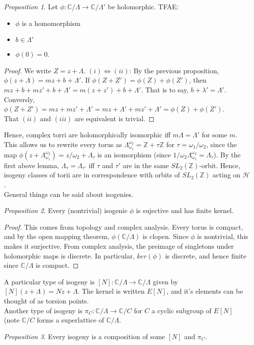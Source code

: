 \documentclass[11pt]{article}
\theoremstyle{definition}
\theoremstyle{example}
\theoremstyle{remark}
\theoremstyle{lemma}
\theoremstyle{proposition}
\newtheorem{proposition}{Proposition}[section]
\theoremstyle{Problem}
\theoremstyle{Solution}
\theoremstyle{theorem}
\theoremstyle{corollary}
\begin{document}
\begin{proposition}
Let $\phi : \mathbb{C}/\Lambda \to \mathbb{C}/\Lambda'$ be holomorphic. TFAE:
\begin{itemize}
\item $\phi$ is a homomorphism
\item $b\in\Lambda'$
\item $\phi(0) = 0$.
\end{itemize}
\end{proposition}
\begin{proof}
We write $Z = z+\Lambda$.
$(i)\iff (ii)$: By the previous proposition, $\phi(z+\Lambda) = mz+b+\Lambda'$. If $\phi(Z+Z') = \phi(Z)+\phi(Z')$, then $mz+b + mz'+b + \Lambda' = m(z+z') + b + \Lambda'$. That is to say, $b+\lambda' = \Lambda'$. Conversly, $\phi(Z+Z') = mz+mz'+\Lambda' = mz+\Lambda' + mz' +\Lambda' = \phi(Z) + \phi(Z')$.\\
That $(ii)$ and $(iii)$ are equivalent is trivial.
\end{proof}
Hence, complex torri are holomorphically isomorphic iff $m\Lambda = \Lambda'$ for some $m$. This allows us to rewrite every torus as $\Lambda_{\omega_1}^{\omega_2} = \mathbb{Z}+\tau\mathbb{Z}$ for $\tau = \omega_1/\omega_2$, since the map $\phi(z+\Lambda_{\omega_1}^{\omega_2}) = z/\omega_2 + \Lambda_\tau$ is an isomorphism (since $1/\omega_2\Lambda_{\omega_1}^{\omega_2} = \Lambda_\tau$). By the first above lemma, $\Lambda_\tau = \Lambda_{\tau'}$ iff $\tau$ and $\tau'$ are in the same $SL_2(\mathbb{Z})$-orbit. Hence, isogeny classes of torii are in correspondence with orbits of $SL_2(\mathbb{Z})$ acting on $\mathcal{H}$.\\
General things can be said about isogenies.
\begin{proposition}
Every (nontrivial) isogenie $\phi$ is sujective and has finite kernel.
\end{proposition}
\begin{proof}
This comes from topology and complex analysis. Every torus is compact, and by the open mapping theorem, $\phi(\mathbb{C}/\Lambda)$ is clopen. Since $\phi$ is nontrivial, this makes it surjective. From complex analysis, the preimage of singletons under holomorphic maps is discrete. In particular, $ker(\phi)$ is discrete, and hence finite since $\mathbb{C}/\Lambda$ is compact.
\end{proof}
A particular type of isogeny is $[N]:\mathbb{C}/\Lambda \to \mathbb{C}/\Lambda$ given by $[N](z+\Lambda) = Nz + \Lambda$. The kernel is written $E[N]$, and it's elements can be thought of as torsion points.\\
Another type of isogeny is $\pi_C:\mathbb{C}/\Lambda \to \mathbb{C}/C$ for $C$ a cyclic subgroup of $E[N]$ (note $\mathbb{C}/C$ forms a superlattice of $\mathbb{C}/\Lambda$.\\
\begin{proposition}
Every isogeny is a composition of some $[N]$ and $\pi_C$.
\end{proposition}
\end{document}
